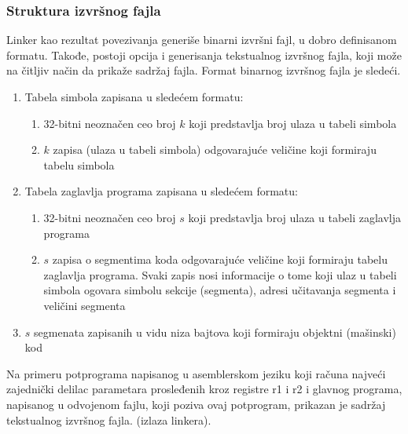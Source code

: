 \subsubsection{Struktura izvršnog fajla}
Linker kao rezultat povezivanja generiše binarni izvršni fajl, u dobro defini\-sanom
formatu. Takođe, postoji opcija i generisanja tekstualnog izvršnog fajla, koji može
na čitljiv način da prikaže sadržaj fajla. Format binarnog izvršnog fajla je sledeći.
\begin{enumerate}
    \item Tabela simbola zapisana u sledećem formatu:
    \begin{enumerate}
        \item 32-bitni neoznačen ceo broj $k$ koji predstavlja broj ulaza u tabeli simbola
        \item $k$ zapisa (ulaza u tabeli simbola) odgovarajuće veličine koji formi\-raju tabelu simbola
    \end{enumerate}
    \item Tabela zaglavlja programa zapisana u sledećem formatu:
    \begin{enumerate}
        \item 32-bitni neoznačen ceo broj $s$ koji predstavlja broj ulaza u tabeli
              zaglavlja programa
        \item $s$ zapisa o segmentima koda odgovarajuće veličine koji formiraju tabelu zaglavlja programa.
              Svaki zapis nosi informacije o tome koji ulaz u tabeli simbola ogovara simbolu sekcije (segmenta),
              adresi učitavanja segmenta i veličini segmenta
    \end{enumerate}
    \item $s$ segmenata zapisanih u vidu niza bajtova koji formiraju objektni (mašinski) kod
\end{enumerate}

\noindent
Na primeru potprograma napisanog u asemblerskom jeziku koji računa najve\-ći zajednički delilac
parametara prosleđenih kroz registre r1 i r2 i glavnog programa, napisanog u odvojenom fajlu, koji poziva ovaj
potprogram, prika\-zan je sadržaj tekstualnog izvršnog fajla.
(izlaza linkera).
\newpage %

